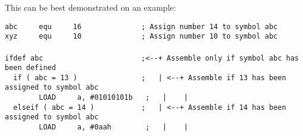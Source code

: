 {                This can be best demonstrated on an example:
                \begin{code}[h!]
                        \mysmallfont{}
                        {\color{highlight_constant}\verb'abc'}\verb'     '{\color{highlight_directive}\verb'equ'}\verb'     '{\color{highlight_unknown_base}\verb'16'}\verb'              '{\color{highlight_comment}\verb'; Assign number 14 to symbol abc'}\\
                        {\color{highlight_constant}\verb'xyz'}\verb'     '{\color{highlight_directive}\verb'equ'}\verb'     '{\color{highlight_unknown_base}\verb'10'}\verb'              '{\color{highlight_comment}\verb'; Assign number 10 to symbol abc'}\\
                        \verb''\\
                        {\color{highlight_directive}\verb'ifdef'}\verb' '{\color{highlight_constant}\verb'abc'}\verb'                       '{\color{highlight_comment}\verb';<--+ Assemble only if symbol abc has been defined'}\\
                        \verb'  '{\color{highlight_directive}\verb'if'}\verb' '{\color{highlight_symbol}\verb'('}\verb' '{\color{highlight_constant}\verb'abc'}\verb' '{\color{highlight_symbol}\verb'='}\verb' '{\color{highlight_unknown_base}\verb'13'}\verb' '{\color{highlight_symbol}\verb')'}\verb'               '{\color{highlight_comment}\verb';   | <--+ Assemble if 13 has been assigned to symbol abc'}\\
                        \verb'        '{\color{highlight_instruction}\verb'LOAD'}\verb'     '{\color{highlight_sfr}\verb'a'}{\color{highlight_oper_sep}\verb','}\verb' '{\color{highlight_imm_bin}\verb'#01010101b'}\verb'   '{\color{highlight_comment}\verb';   |    |'}\\
                        \verb'  '{\color{highlight_directive}\verb'elseif'}\verb' '{\color{highlight_symbol}\verb'('}\verb' '{\color{highlight_constant}\verb'abc'}\verb' '{\color{highlight_symbol}\verb'='}\verb' '{\color{highlight_unknown_base}\verb'14'}\verb' '{\color{highlight_symbol}\verb')'}\verb'           '{\color{highlight_comment}\verb';   | <--+ Assemble if 14 has been assigned to symbol abc'}\\
                        \verb'        '{\color{highlight_instruction}\verb'LOAD'}\verb'     '{\color{highlight_sfr}\verb'a'}{\color{highlight_oper_sep}\verb','}\verb' '{\color{highlight_imm_hex}\verb'#0aah'}\verb'        '{\color{highlight_comment}\verb';   |    |'}\\

\end{code}}
